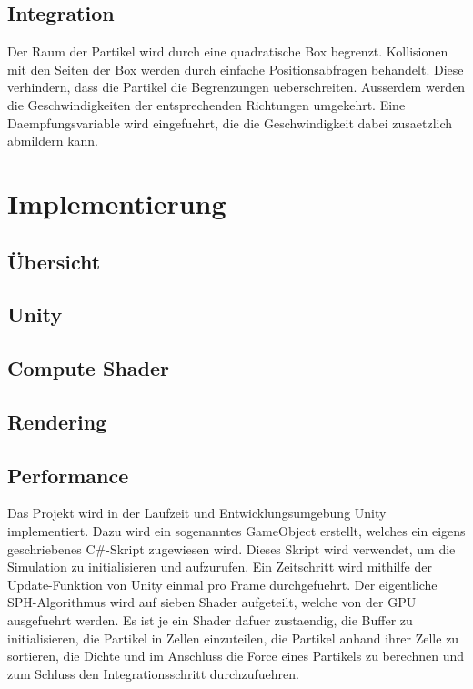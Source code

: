 \documentclass[a4paper]{paper}
\begin{document}
\subsection{Integration}

Der Raum der Partikel wird durch eine quadratische Box begrenzt. Kollisionen mit den Seiten der Box werden durch einfache Positionsabfragen behandelt. Diese verhindern, dass die Partikel die Begrenzungen ueberschreiten. Ausserdem werden die Geschwindigkeiten der entsprechenden Richtungen umgekehrt. Eine Daempfungsvariable wird eingefuehrt, die die Geschwindigkeit dabei zusaetzlich abmildern kann.

\section{Implementierung}
\subsection{Übersicht}
\subsection{Unity}

\subsection{Compute Shader}

\subsection{Rendering}
\subsection{Performance}
Das Projekt wird in der Laufzeit und Entwicklungsumgebung Unity implementiert. Dazu wird ein sogenanntes GameObject erstellt, welches ein eigens geschriebenes C\#-Skript zugewiesen wird. Dieses Skript wird verwendet, um die Simulation zu initialisieren und aufzurufen. %
Ein Zeitschritt wird mithilfe der Update-Funktion von Unity einmal pro Frame durchgefuehrt. Der eigentliche SPH-Algorithmus wird auf sieben Shader aufgeteilt, welche von der GPU ausgefuehrt werden. Es ist je ein Shader dafuer zustaendig, die Buffer zu initialisieren, die Partikel in Zellen einzuteilen, die Partikel anhand ihrer Zelle zu sortieren, die Dichte und im Anschluss die Force eines Partikels zu berechnen und zum Schluss den Integrationsschritt durchzufuehren.
\end{document}
